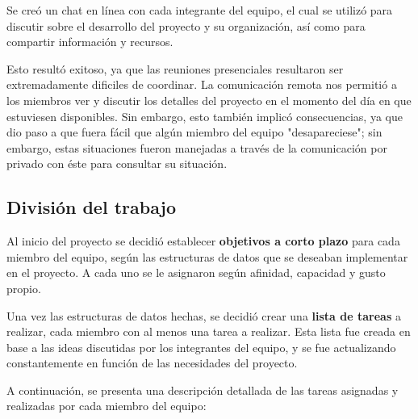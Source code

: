\documentclass[9pt,letterpaper,onecolumn]{rho-class/rho}
\begin{document}
Se creó un chat en línea con cada integrante del equipo, el cual se utilizó para discutir sobre el desarrollo del proyecto y su organización, así como para compartir información y recursos.

\vspace{0.5cm}

Esto resultó exitoso, ya que las reuniones presenciales resultaron ser extremadamente dificiles de coordinar. La comunicación remota nos permitió a los miembros ver y discutir los detalles del proyecto en el momento del día en que estuviesen disponibles. Sin embargo, esto también implicó consecuencias, ya que dio paso a que fuera fácil que algún miembro del equipo "desapareciese"; sin embargo, estas situaciones fueron manejadas a través de la comunicación por privado con éste para consultar su situación.

\subsection{División del trabajo}

Al inicio del proyecto se decidió establecer \textbf{objetivos a corto plazo} para cada miembro del equipo, según las estructuras de datos que se deseaban implementar en el proyecto. A cada uno se le asignaron según afinidad, capacidad y gusto propio.

\vspace{0.5cm}

Una vez las estructuras de datos hechas, se decidió crear una \textbf{lista de tareas} a realizar, cada miembro con al menos una tarea a realizar. Esta lista fue creada en base a las ideas discutidas por los integrantes del equipo, y se fue actualizando constantemente en función de las necesidades del proyecto.

A continuación, se presenta una descripción detallada de las tareas asignadas y realizadas por cada miembro del equipo:
\end{document}
